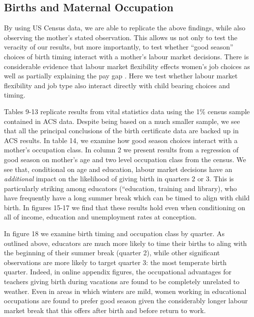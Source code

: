 \documentclass[a4paper, 12 pt]{article}
\theoremstyle{plain}
\begin{document}
\begin{doublespace}
\subsection{Births and Maternal Occupation}
By using US Census data, we are able to replicate the above findings, while also observing the mother's stated observation.  This allows us not only to test the veracity of our results, but more importantly, to test whether ``good season'' choices of birth timing interact with a mother's labour market decisions.  There is considerable evidence that labour market flexibility effects women's job choices as well as partially explaining the pay gap \citep{Goldin2014}.  Here we test whether labour market flexibility and job type also interact directly with child bearing choices and timing.

Tables 9-13 replicate results from vital statistics data using the 1\% census sample contained in ACS data.  Despite being based on a much smaller sample, we see that all the principal conclusions of the birth certificate data are backed up in ACS results.  In table 14, we examine how good season choices interact with a mother's occupation class.  In column 2 we present results from a regression of good season on mother's age and two level occupation class from the census.  We see that, conditional on age and education, labour market decisions have an \emph{additional} impact on the likelihood of giving birth in quarters 2 or 3.  This is particularly striking among educators (``education, training and library), who have frequently have a long summer break which can be timed to align with child birth.  In figures 15-17 we find that these results hold even when conditioning on all of income, education and unemployment rates at conception.

In figure 18 we examine birth timing and occupation class by quarter.  As outlined above, educators are much more likely to time their births to aling with the beginning of their summer break (quarter 2), while other significant observations are more likely to target quarter 3: the most temperate birth quarter.  Indeed, in online appendix figures, the occupational advantages for teachers giving birth during vacations are found to be completely unrelated to weather.  Even in areas in which winters are mild, women working in educational occupations are found to prefer good season given the considerably longer labour market break that this offers after birth and before return to work.



\end{doublespace}
\end{document}
